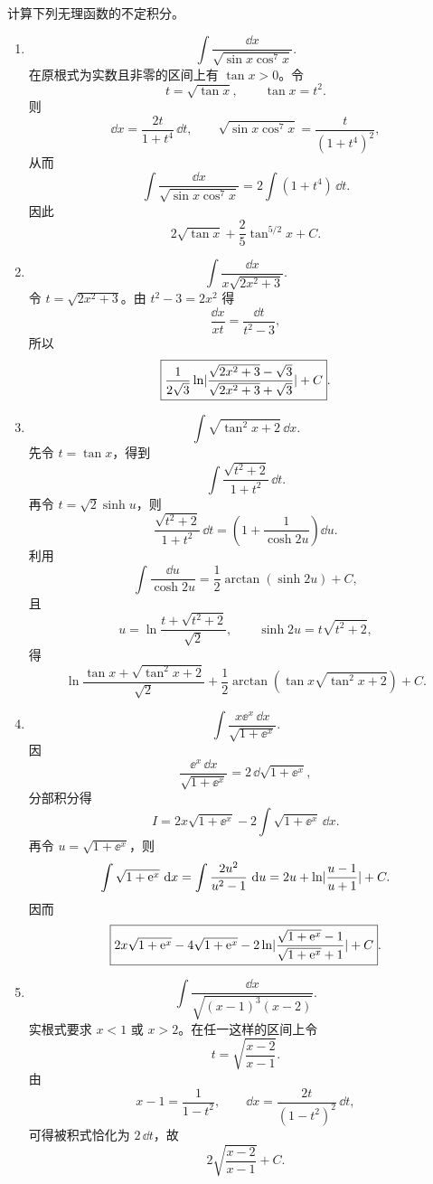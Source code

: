 \begin{xsolution}
计算下列无理函数的不定积分。
  \begin{enumerate}[label=(\arabic*)]
    \item
    \[
      \int\frac{\dd x}{\sqrt{\sin x\cos^7x}}.
    \]
    在原根式为实数且非零的区间上有 $\tan x>0$。令
    \[
      t=\sqrt{\tan x},
      \qquad \tan x=t^2.
    \]
    则
    \[
      \dd x=\frac{2t}{1+t^4}\,\dd t,
      \qquad
      \sqrt{\sin x\cos^7x}=\frac{t}{(1+t^4)^2},
    \]
    从而
    \[
      \int\frac{\dd x}{\sqrt{\sin x\cos^7x}}
      =2\int(1+t^4)\,\dd t.
    \]
    因此
    \[
      \boxed{2\sqrt{\tan x}+\frac25\tan^{5/2}x+C}.
    \]

    \item
    \[
      \int\frac{\dd x}{x\sqrt{2x^2+3}}.
    \]
    令 $t=\sqrt{2x^2+3}$。由 $t^2-3=2x^2$ 得
    \[
      \frac{\dd x}{x t}=\frac{\dd t}{t^2-3},
    \]
    所以
    \[
      \boxed{
      \frac1{2\sqrt3}\ln\lvert
        \frac{\sqrt{2x^2+3}-\sqrt3}{\sqrt{2x^2+3}+\sqrt3}\rvert
      +C}.
    \]

    \item
    \[
      \int\sqrt{\tan^2x+2}\,\dd x.
    \]
    先令 $t=\tan x$，得到
    \[
      \int\frac{\sqrt{t^2+2}}{1+t^2}\,\dd t.
    \]
    再令 $t=\sqrt2\sinh u$，则
    \[
      \frac{\sqrt{t^2+2}}{1+t^2}\,\dd t
      =\left(1+\frac1{\cosh2u}\right)\dd u.
    \]
    利用
    \[
      \int\frac{\dd u}{\cosh2u}
      =\frac12\arctan(\sinh2u)+C,
    \]
    且
    \[
      u=\ln\frac{t+\sqrt{t^2+2}}{\sqrt2},
      \qquad
      \sinh2u=t\sqrt{t^2+2},
    \]
    得
    \[
      \boxed{
      \ln\frac{\tan x+\sqrt{\tan^2x+2}}{\sqrt2}
      +\frac12\arctan\left(\tan x\sqrt{\tan^2x+2}\right)+C}.
    \]

    \item
    \[
      \int\frac{x\ee^x\,\dd x}{\sqrt{1+\ee^x}}.
    \]
    因
    \[
      \frac{\ee^x\,\dd x}{\sqrt{1+\ee^x}}
      =2\,\dd\sqrt{1+\ee^x},
    \]
    分部积分得
    \[
      I=2x\sqrt{1+\ee^x}-2\int\sqrt{1+\ee^x}\,\dd x.
    \]
    再令 $u=\sqrt{1+\ee^x}$，则
    \[
      \int\sqrt{1+\mathrm{e}^x}\,\mathop{}\!\mathrm{d} x
      =\int\frac{2u^2}{u^2-1}\,\mathop{}\!\mathrm{d} u
      =2u+\ln\lvert\frac{u-1}{u+1}\rvert+C.
    \]
    因而
    \[
      \boxed{
      2x\sqrt{1+\mathrm{e}^x}-4\sqrt{1+\mathrm{e}^x}
      -2\ln\lvert\frac{\sqrt{1+\mathrm{e}^x}-1}{\sqrt{1+\mathrm{e}^x}+1}\rvert+C}.
    \]

    \item
    \[
      \int\frac{\dd x}{\sqrt{(x-1)^3(x-2)}}.
    \]
    实根式要求 $x<1$ 或 $x>2$。在任一这样的区间上令
    \[
      t=\sqrt{\frac{x-2}{x-1}}.
    \]
    由
    \[
      x-1=\frac1{1-t^2},
      \qquad
      \dd x=\frac{2t}{(1-t^2)^2}\,\dd t,
    \]
    可得被积式恰化为 $2\,\dd t$，故
    \[
      \boxed{2\sqrt{\frac{x-2}{x-1}}+C}.
    \]


\end{enumerate}
\end{xsolution}
